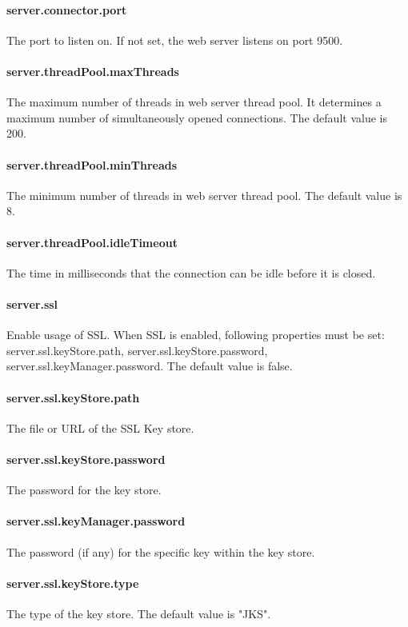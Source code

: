 \documentclass[12pt,a4paper]{report}
\begin{document}
\paragraph{server.connector.port}
The port to listen on. If not set, the web server listens on port 9500.

\paragraph{server.threadPool.maxThreads}
The maximum number of threads in web server thread pool. It determines a maximum
number of simultaneously opened connections. The default value is 200.

\paragraph{server.threadPool.minThreads}
The minimum number of threads in web server thread pool. The default value is 8.

\paragraph{server.threadPool.idleTimeout}
The time in milliseconds that the connection can be idle before it is closed.

\paragraph{server.ssl}
Enable usage of SSL. When SSL is enabled, following properties must be set:
server.ssl.keyStore.path, server.ssl.keyStore.password, server.ssl.keyManager.password.
The default value is false.

\paragraph{server.ssl.keyStore.path}
The file or URL of the SSL Key store.
\paragraph{server.ssl.keyStore.password}
The password for the key store.
\paragraph{server.ssl.keyManager.password}
The password (if any) for the specific key within the key store.
\paragraph{server.ssl.keyStore.type}
The type of the key store. The default value is "JKS".
\end{document}
